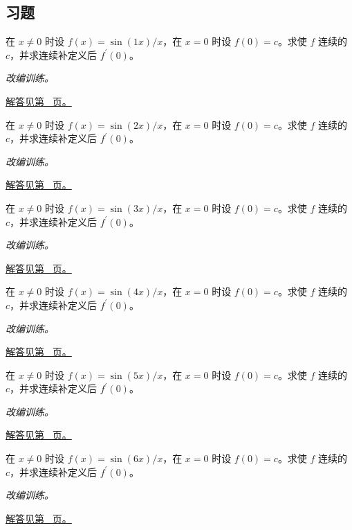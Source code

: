 \documentclass[UTF8,12pt,a4paper,fontset=fandol]{ctexart}
\begin{document}
\subsection{习题}
\begin{example}[可去间断点的补定义]\label{ex:c6q1}
在 $x\ne0$ 时设 $f(x)=\sin(1x)/x$，在 $x=0$ 时设 $f(0)=c$。求使 $f$ 连续的 $c$，并求连续补定义后 $f^{\prime}(0)$。
\par\textit{改编训练。}\par\hyperref[ans:c6q1]{解答见第~\pageref{ans:c6q1} 页。}
\end{example}
\begin{example}[可去间断点的补定义]\label{ex:c6q2}
在 $x\ne0$ 时设 $f(x)=\sin(2x)/x$，在 $x=0$ 时设 $f(0)=c$。求使 $f$ 连续的 $c$，并求连续补定义后 $f^{\prime}(0)$。
\par\textit{改编训练。}\par\hyperref[ans:c6q2]{解答见第~\pageref{ans:c6q2} 页。}
\end{example}
\begin{example}[可去间断点的补定义]\label{ex:c6q3}
在 $x\ne0$ 时设 $f(x)=\sin(3x)/x$，在 $x=0$ 时设 $f(0)=c$。求使 $f$ 连续的 $c$，并求连续补定义后 $f^{\prime}(0)$。
\par\textit{改编训练。}\par\hyperref[ans:c6q3]{解答见第~\pageref{ans:c6q3} 页。}
\end{example}
\begin{example}[可去间断点的补定义]\label{ex:c6q4}
在 $x\ne0$ 时设 $f(x)=\sin(4x)/x$，在 $x=0$ 时设 $f(0)=c$。求使 $f$ 连续的 $c$，并求连续补定义后 $f^{\prime}(0)$。
\par\textit{改编训练。}\par\hyperref[ans:c6q4]{解答见第~\pageref{ans:c6q4} 页。}
\end{example}
\begin{example}[可去间断点的补定义]\label{ex:c6q5}
在 $x\ne0$ 时设 $f(x)=\sin(5x)/x$，在 $x=0$ 时设 $f(0)=c$。求使 $f$ 连续的 $c$，并求连续补定义后 $f^{\prime}(0)$。
\par\textit{改编训练。}\par\hyperref[ans:c6q5]{解答见第~\pageref{ans:c6q5} 页。}
\end{example}
\begin{example}[可去间断点的补定义]\label{ex:c6q6}
在 $x\ne0$ 时设 $f(x)=\sin(6x)/x$，在 $x=0$ 时设 $f(0)=c$。求使 $f$ 连续的 $c$，并求连续补定义后 $f^{\prime}(0)$。
\par\textit{改编训练。}\par\hyperref[ans:c6q6]{解答见第~\pageref{ans:c6q6} 页。}
\end{example}
\end{document}
